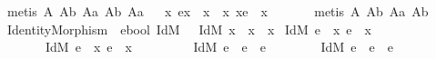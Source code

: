 \begin{isabellebody}
\endisadelimproof
%
\isatagproof
{}\isamarkupfalse%
\ {\isacharparenleft}metis\ A{}\ A{}b\ A{}a\ A{}b\ A{}a{\isacharparenright}%
\endisatagproof
{\isafoldproof}%
%
\isadelimproof
%
\endisadelimproof
\ \isanewline
{}\isamarkupfalse%
\ {\isachardoublequoteopen}{\isacharparenleft}\isactrlbold {\isasymforall}x{\isachardot}\ e{\isasymcdot}x\ {\isasymgreaterapprox}\ x{\isacharparenright}\ \isactrlbold {\isasymleftrightarrow}\ {\isacharparenleft}\isactrlbold {\isasymforall}x{\isachardot}\ x{\isasymcdot}e\ {\isasymgreaterapprox}\ x{\isacharparenright}{\isachardoublequoteclose}%
\isadelimproof
\ \ \ \ \ %
\endisadelimproof
%
\isatagproof
{}\isamarkupfalse%
\ {\isacharparenleft}metis\ A{}\ A{}b\ A{}a\ A{}b{\isacharparenright}%
\endisatagproof
{\isafoldproof}%
%
\isadelimproof
%
\endisadelimproof
\isanewline
\isanewline
\isanewline
{}\isamarkupfalse%
\ IdentityMorphism\ {\isacharcolon}{\isacharcolon}\ {\isachardoublequoteopen}e{\isasymRightarrow}bool{\isachardoublequoteclose}\ {\isacharparenleft}{\isachardoublequoteopen}IdM{\isacharunderscore}{\isachardoublequoteclose}\ {\isacharbrackleft}{}{}{}{\isacharbrackright}{}{}{\isacharparenright}\ \ {\isachardoublequoteopen}IdM\ x\ {\isasymequiv}\ x\ {\isasymapprox}\ {\isacharparenleft}{\isasymbox}x{\isacharparenright}{\isachardoublequoteclose}\isanewline
\isanewline
{}\isamarkupfalse%
\ {\isachardoublequoteopen}{\isacharparenleft}IdM\ e\ \isactrlbold {\isasymleftrightarrow}\ {\isacharparenleft}\isactrlbold {\isasymexists}x{\isachardot}\ e\ {\isasymapprox}\ {\isacharparenleft}{\isasymbox}x{\isacharparenright}{\isacharparenright}{\isacharparenright}\ \isactrlbold {\isasymand}\isanewline
\ \ \ \ \ \ \ {\isacharparenleft}IdM\ e\ \isactrlbold {\isasymleftrightarrow}\ {\isacharparenleft}\isactrlbold {\isasymexists}x{\isachardot}\ e\ {\isasymapprox}\ {\isacharparenleft}x{\isasymbox}{\isacharparenright}{\isacharparenright}{\isacharparenright}\ \isactrlbold {\isasymand}\ \isanewline
\ \ \ \ \ \ \ {\isacharparenleft}IdM\ e\ \isactrlbold {\isasymleftrightarrow}\ e\ {\isasymapprox}\ {\isacharparenleft}{\isasymbox}e{\isacharparenright}{\isacharparenright}\ \isactrlbold {\isasymand}\isanewline
\ \ \ \ \ \ \ {\isacharparenleft}IdM\ e\ \isactrlbold {\isasymleftrightarrow}\ e\ {\isasymapprox}\ {\isacharparenleft}e{\isasymbox}{\isacharparenright}{\isacharparenright}\ \isactrlbold {\isasymand}\isanewline

\end{isabellebody}
